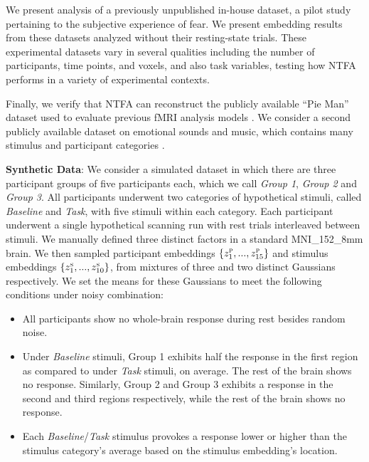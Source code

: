 \documentclass[twoside]{article}
\newcommand{\scp}{\textsc{p}}
\newcommand{\scs}{\textsc{s}}
\begin{document}
We present analysis of a previously unpublished in-house dataset, a pilot study pertaining to the subjective experience of fear.  We present embedding results from these datasets analyzed without their resting-state trials.  These experimental datasets vary in several qualities including the number of participants, time points, and voxels, and also task variables, testing how NTFA performs in a variety of experimental contexts.

Finally, we verify that NTFA can reconstruct the publicly available ``Pie Man'' dataset used to evaluate previous fMRI analysis models \citep{Anderson2016}. We consider a second publicly available dataset on emotional sounds and music, which contains many stimulus and participant categories \citep{10.1371/journal.pone.0156859}.

\textbf{Synthetic Data}: %
We consider a simulated dataset in which there are three participant groups of five participants each, which we call \emph{Group 1}, \emph{Group 2} and \emph{Group 3}. All participants underwent two categories of hypothetical stimuli, called \emph{Baseline} and \emph{Task}, with five stimuli within each category.  Each participant underwent a single hypothetical scanning run with rest trials interleaved between stimuli. We manually defined three distinct factors in a standard MNI\_152\_8mm brain. We then sampled participant embeddings $\{z_1^\scp,...,z_{15}^\scp \}$ and stimulus embeddings $\{ z_1^\scs,...,z_{10}^\scs\}$, from mixtures of three and two distinct Gaussians respectively. We set the means for these Gaussians to meet the following conditions under noisy combination:

\begin{itemize}[labelwidth=0.5em, 
                labelsep=0.5em, 
                leftmargin=1.0em,
                topsep=0em,
                label={\tiny\raisebox{0.7ex}{\textbullet}}]
    \item All participants show no whole-brain response during rest besides random noise.
    \item Under \emph{Baseline} stimuli, Group 1 exhibits half the response in the first region as compared to under \emph{Task} stimuli, on average.  The rest of the brain shows no response. Similarly, Group 2 and Group 3 exhibits a response in the second and third regions respectively, while the rest of the brain shows no response.
    \item Each \emph{Baseline}/\emph{Task} stimulus provokes a response lower or higher than the stimulus category's average based on the stimulus embedding's location.
\end{itemize}
\end{document}
